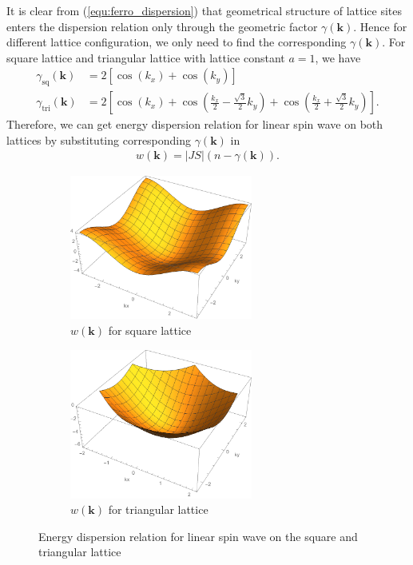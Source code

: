 \documentclass[a4paper,12pt]{article}
\begin{document}
		It is clear from (\ref{equ:ferro_dispersion}) that geometrical structure of lattice sites enters the dispersion relation only through the geometric factor $\gamma(\mathbf{k})$. Hence for different lattice configuration, we only need to find the corresponding $\gamma(\mathbf{k})$. For square lattice and triangular lattice with lattice constant $a=1$, we have 
		\begin{align}
			\gamma_{\text{sq}}(\mathbf{k})&=2\left[\cos(k_x)+\cos(k_y)\right]\\
			\gamma_{\text{tri}}(\mathbf{k})&=2\left[\cos(k_x)+\cos\left(\frac{k_x}{2}-\frac{\sqrt{3}}{2}k_y\right)+\cos\left(\frac{k_x}{2}+\frac{\sqrt{3}}{2}k_y\right)\right].
		\end{align}
		Therefore, we can get energy dispersion relation for linear spin wave on both lattices by substituting corresponding $\gamma(\mathbf{k})$ in
		\begin{align}
			w(\mathbf{k})=|JS|(n-\gamma(\mathbf{k})).
		\end{align}
				\begin{figure}[H]
			\centering
			\begin{subfigure}[b]{0.4\textwidth}
				\includegraphics[width=6cm,keepaspectratio]{sq_dispersion}
				\caption{$w(\mathbf{k})$ for square lattice }
				\label{fig:sq_dispersion}
			\end{subfigure}
			\quad
			\begin{subfigure}[b]{0.4\textwidth}
				\includegraphics[width=6cm,keepaspectratio]{tri_dispersion}
				\caption{$w(\mathbf{k})$ for triangular lattice }
				\label{fig:tri_dispersion}
			\end{subfigure}
			\caption{Energy dispersion relation for linear spin wave on the square and triangular lattice}
		\end{figure}
\end{document}
